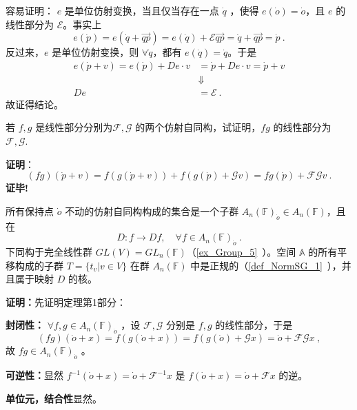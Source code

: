 容易证明： $e$ 是单位仿射变换，当且仅当存在一点 $\dot q$ ，使得 $e(\dot o)=\dot o$，且 $e$ 的线性部分为 $\mathcal E$。事实上
 \begin{equation}
  e(\dot p)=e(\dot q+\overrightarrow{qp})=e(\dot q)+\mathcal E \overrightarrow{qp}=\dot q+\overrightarrow{qp}=\dot p~.
 \end{equation}
反过来，$e$ 是单位仿射变换，则 $\forall\dot q$，都有 $e(\dot q)=\dot q$。于是
\begin{equation}
\begin{aligned}
e(\dot p+v)=e(\dot p)+De\cdot v&=\dot p+De\cdot v=\dot p+v\\
&\Downarrow\\
De&=\mathcal E~.
\end{aligned}
\end{equation}
故证得结论。
\begin{example}{}
若 $f,g$ 是线性部分分别为$\mathcal F,\mathcal G$ 的两个仿射自同构，试证明，$fg$ 的线性部分为 $\mathcal {F,G}$.

\textbf{证明}：
\begin{equation}
(fg)(\dot p+v)=f(g(\dot p+v))+f(g(\dot p)+\mathcal G v)=fg(\dot p)+\mathcal {FG}v~.
\end{equation}
\textbf{证毕!}
\end{example}
\begin{theorem}{}
所有保持点 $\dot o$ 不动的仿射自同构构成的集合是一个子群 $A_n(\mathbb F)_{\dot o}\in A_n(\mathbb F)$，且在 
\begin{equation}
D:f\rightarrow Df,\quad \forall f\in A_n(\mathbb F)_{\dot o}~.
\end{equation}
下同构于完全线性群 $GL(V)=GL_n(\mathbb F)$（\autoref{ex_Group_5}~）。空间 $\mathbb A$ 的所有平移构成的子群 $T=\{t_v|v\in V\}$ 在群 $A_n(\mathbb F)$ 中是正规的（\autoref{def_NormSG_1}~），并且属于映射 $D$ 的核。
\end{theorem}
\textbf{证明：}先证明定理第1部分：

\textbf{封闭性：} $\forall f,g\in A_n(\mathbb F)_{\dot o}$ ，设 $\mathcal F,\mathcal G$ 分别是 $f,g$ 的线性部分，于是 
\begin{equation}
(fg)(\dot o+x)=f(g(\dot o+x))=f(g(\dot o)+\mathcal G x)=\dot o+\mathcal{FG}x~,
\end{equation}
故 $fg\in A_n(\mathbb F)_{\dot o}$ 。

\textbf{可逆性：}显然 $f^{-1}(\dot o+x)=\dot o+\mathcal F^{-1}x$ 是 $f(\dot o+x)=\dot o+\mathcal F x$ 的逆。

\textbf{单位元，结合性}显然。

